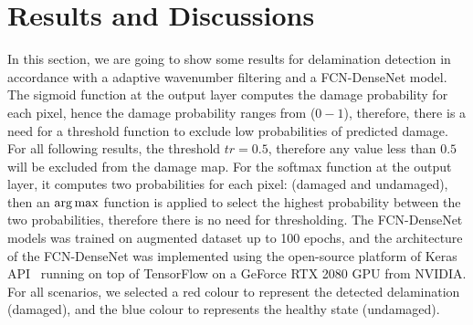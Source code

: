 \section{Results and Discussions}
	In this section, we are going to show some results for delamination detection in accordance with a adaptive wavenumber filtering and a FCN-DenseNet model. 
	The sigmoid function at the output layer computes the damage probability for each pixel, hence the damage probability ranges from (\(0 - 1\)), therefore, there is a need for a threshold function to exclude low probabilities of predicted damage. 
	For all following results, the threshold \(tr = 0.5\), therefore any value less than \(0.5\) will be excluded from the damage map.
	For the softmax function at the output layer, it computes two probabilities for each pixel: (damaged and undamaged), then an \(\operatorname*{arg\,max}\) function is applied to select the highest probability between the two probabilities, therefore there is no need for thresholding. 
	The FCN-DenseNet models was trained on augmented dataset up to 100 epochs, and the architecture of the FCN-DenseNet  was implemented using the open-source platform of Keras API~\cite{chollet2015keras} running on top of TensorFlow on a GeForce RTX 2080  GPU from NVIDIA.
	For all scenarios, we selected a red colour to represent the detected delamination (damaged), and the blue colour to represents the healthy state (undamaged).
	
